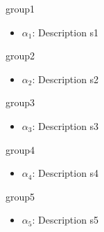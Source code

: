 group1
\begin{itemize}
\item $\alpha_1$: Description s1
\end{itemize}
group2
\begin{itemize}
\item $\alpha_2$: Description s2
\end{itemize}
group3
\begin{itemize}
\item $\alpha_3$: Description s3
\end{itemize}
group4
\begin{itemize}
\item $\alpha_4$: Description s4
\end{itemize}
group5
\begin{itemize}
\item $\alpha_5$: Description s5
\end{itemize}
